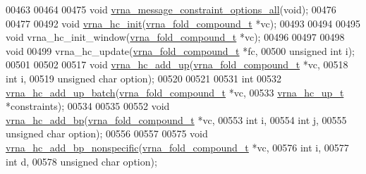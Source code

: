 \begin{DoxyCode}
00463 
00464 
00475 \textcolor{keywordtype}{void} \hyperlink{group__constraints_gaec7e13fa0465c2acc7a621d1aecb709f}{vrna\_message\_constraint\_options\_all}(\textcolor{keywordtype}{void});
00476 
00477 
00492 \textcolor{keywordtype}{void} \hyperlink{group__hard__constraints_ga36ff456c43bf920629cee5a236e4f0ff}{vrna\_hc\_init}(\hyperlink{group__fold__compound_structvrna__fc__s}{vrna\_fold\_compound\_t} *vc);
00493 
00494 
00495 \textcolor{keywordtype}{void} vrna\_hc\_init\_window(\hyperlink{group__fold__compound_structvrna__fc__s}{vrna\_fold\_compound\_t} *vc);
00496 
00497 
00498 \textcolor{keywordtype}{void}
00499 vrna\_hc\_update(\hyperlink{group__fold__compound_structvrna__fc__s}{vrna\_fold\_compound\_t} *fc,
00500                \textcolor{keywordtype}{unsigned} \textcolor{keywordtype}{int}         i);
00501 
00502 
00517 \textcolor{keywordtype}{void} \hyperlink{group__hard__constraints_ga447d88e06ad97bb225cd83310ace8345}{vrna\_hc\_add\_up}(\hyperlink{group__fold__compound_structvrna__fc__s}{vrna\_fold\_compound\_t}  *vc,
00518                     \textcolor{keywordtype}{int}                   i,
00519                     \textcolor{keywordtype}{unsigned} \textcolor{keywordtype}{char}         option);
00520 
00521 
00531 \textcolor{keywordtype}{int}
00532 \hyperlink{group__hard__constraints_ga5070f296c8af2baea10951525519464f}{vrna\_hc\_add\_up\_batch}(\hyperlink{group__fold__compound_structvrna__fc__s}{vrna\_fold\_compound\_t} *vc,
00533                      \hyperlink{group__hard__constraints_structvrna__hc__up__s}{vrna\_hc\_up\_t}         *constraints);
00534 
00535 
00552 \textcolor{keywordtype}{void} \hyperlink{group__hard__constraints_ga7cba95ebe2ceb5ec9a5768f2232854fd}{vrna\_hc\_add\_bp}(\hyperlink{group__fold__compound_structvrna__fc__s}{vrna\_fold\_compound\_t}  *vc,
00553                     \textcolor{keywordtype}{int}                   i,
00554                     \textcolor{keywordtype}{int}                   j,
00555                     \textcolor{keywordtype}{unsigned} \textcolor{keywordtype}{char}         option);
00556 
00557 
00575 \textcolor{keywordtype}{void} \hyperlink{group__hard__constraints_gaed50398ade2d4852c9e82592fe76046c}{vrna\_hc\_add\_bp\_nonspecific}(\hyperlink{group__fold__compound_structvrna__fc__s}{vrna\_fold\_compound\_t}  *vc,
00576                                 \textcolor{keywordtype}{int}                   i,
00577                                 \textcolor{keywordtype}{int}                   d,
00578                                 \textcolor{keywordtype}{unsigned} \textcolor{keywordtype}{char}         option);

\end{DoxyCode}
